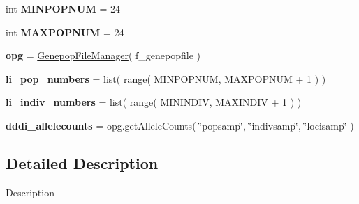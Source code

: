 \begin{DoxyCompactItemize}
\item 
int {\bfseries M\+I\+N\+P\+O\+P\+N\+UM} = 24\hypertarget{namespacenegui_1_1genepopfilemanager_a2fe4b54646d3e79d3881dfb73ef33aa3}{}\label{namespacenegui_1_1genepopfilemanager_a2fe4b54646d3e79d3881dfb73ef33aa3}

\item 
int {\bfseries M\+A\+X\+P\+O\+P\+N\+UM} = 24\hypertarget{namespacenegui_1_1genepopfilemanager_a1ed0364fa10fc43bffa66e1aabb0f63f}{}\label{namespacenegui_1_1genepopfilemanager_a1ed0364fa10fc43bffa66e1aabb0f63f}

\item 
{\bfseries opg} = \hyperlink{classnegui_1_1genepopfilemanager_1_1GenepopFileManager}{Genepop\+File\+Manager}( f\+\_\+genepopfile )\hypertarget{namespacenegui_1_1genepopfilemanager_ac07ebec9ed1824289d92441281663eca}{}\label{namespacenegui_1_1genepopfilemanager_ac07ebec9ed1824289d92441281663eca}

\item 
{\bfseries li\+\_\+pop\+\_\+numbers} = list( range( M\+I\+N\+P\+O\+P\+N\+UM, M\+A\+X\+P\+O\+P\+N\+UM + 1 ) )\hypertarget{namespacenegui_1_1genepopfilemanager_ac427ad4321d2f0764268a22ccb99e019}{}\label{namespacenegui_1_1genepopfilemanager_ac427ad4321d2f0764268a22ccb99e019}

\item 
{\bfseries li\+\_\+indiv\+\_\+numbers} = list( range( M\+I\+N\+I\+N\+D\+IV, M\+A\+X\+I\+N\+D\+IV + 1 ) )\hypertarget{namespacenegui_1_1genepopfilemanager_a7f7d784916f02437dc8cf41fab6e5f43}{}\label{namespacenegui_1_1genepopfilemanager_a7f7d784916f02437dc8cf41fab6e5f43}

\item 
{\bfseries dddi\+\_\+allelecounts} = opg.\+get\+Allele\+Counts( \char`\"{}popsamp\char`\"{}, \char`\"{}indivsamp\char`\"{}, \char`\"{}locisamp\char`\"{} )\hypertarget{namespacenegui_1_1genepopfilemanager_a14dc216d7e9118aa81403c9857641e85}{}\label{namespacenegui_1_1genepopfilemanager_a14dc216d7e9118aa81403c9857641e85}

\end{DoxyCompactItemize}


\subsection{Detailed Description}
\begin{DoxyVerb}Description
\end{DoxyVerb}
 